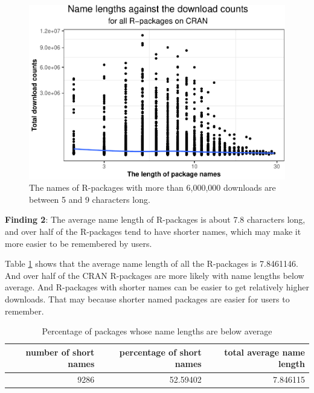 \documentclass[
]{book}
\newenvironment{discovery}[1]{%
  \begin{tcolorbox}[colback=blue!30,colframe=blue!80!black]#1}{\end{tcolorbox}}
\begin{document}
\begin{figure}

{\centering \includegraphics{figures/namelength-plot-1} 

}

\caption{The names of R-packages with more than 6,000,000 downloads are between 5 and 9 characters long.}\label{fig:namelength-plot}
\end{figure}

\begin{discovery}
\textbf{Finding 2}: The average name length of R-packages is about 7.8
characters long, and over half of the R-packages tend to have shorter
names, which may make it more easier to be remembered by users.
\end{discovery}

Table \ref{tab:pct-lngname} shows that the average name length of all the R-packages is 7.8461146. And over half of the CRAN R-packages are more likely with name lengths below average. And R-packages with shorter names can be easier to get relatively higher downloads. That may because shorter named packages are easier for users to remember.

\begin{table}

\caption{\label{tab:pct-lngname}Percentage of packages whose name lengths are below average}
\centering
\begin{tabular}[t]{r|r|r}
\hline
number of short names & percentage of short names & total average name length\\
\hline
9286 & 52.59402 & 7.846115\\
\hline
\end{tabular}
\end{table}
\end{document}
